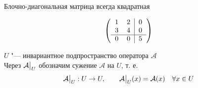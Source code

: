 \begin{remark}
	Блочно-диагональная матрица всегда квадратная
\end{remark}

\begin{eg}
	$$ \left(
	\begin{tabular}{c c | c}
		1 & 2 & 0 \\
		3 & 4 & 0 \\
		\hline
		0 & 0 & 5
	\end{tabular} \right) $$
\end{eg}

\begin{definition}
	$ U $ "--- инвариантное подпространство оператора $ \mathcal{A} $ \\
	Через $ \mathcal{A}\big|_{U}^{} $ обозначим сужение $ \mathcal{A} $ на $ U $, т. е.
	$$ \mathcal{A}\big|_{U}^{} : U \to U, \qquad \mathcal{A}\big|_{U}^{}(x) = \mathcal{A}(x) \quad \forall x \in U $$
\end{definition}

